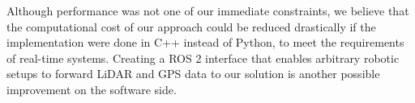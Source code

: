Although performance was not one of our immediate constraints, we believe that the computational cost of our approach could be reduced drastically if the implementation were done in C++ instead of Python, to meet the requirements of real-time systems. Creating a ROS 2 interface that enables arbitrary robotic setups to forward LiDAR and GPS data to our solution is another possible improvement on the software side.


